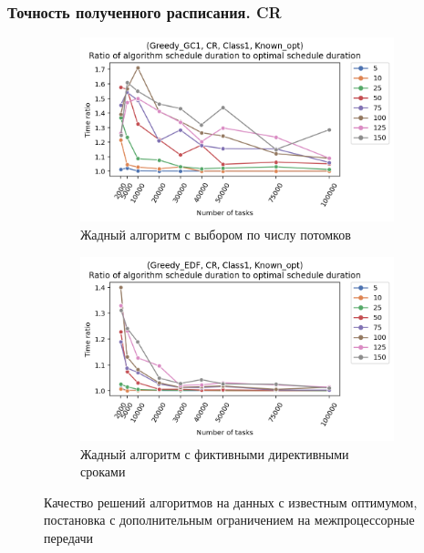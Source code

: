 \begin{frame}
    \frametitle{Точность полученного расписания. CR}
    \begin{figure}
        \begin{subfigure}{0.49\textwidth}
            \includegraphics[width=\textwidth]{imgs/ideal_1/CR/gr_amalgamated.png}
            \caption{Жадный алгоритм с выбором по числу потомков}
        \end{subfigure}
        \begin{subfigure}{0.49\textwidth}
            \includegraphics[width=\textwidth]{imgs/ideal_1/CR_EDF/gr_amalgamated.png}
            \caption{Жадный алгоритм с фиктивными директивными сроками}
        \end{subfigure}
        \caption{Качество решений алгоритмов на данных с известным оптимумом,\\ постановка с дополнительным ограничением на межпроцессорные передачи}
    \end{figure}
\end{frame}

